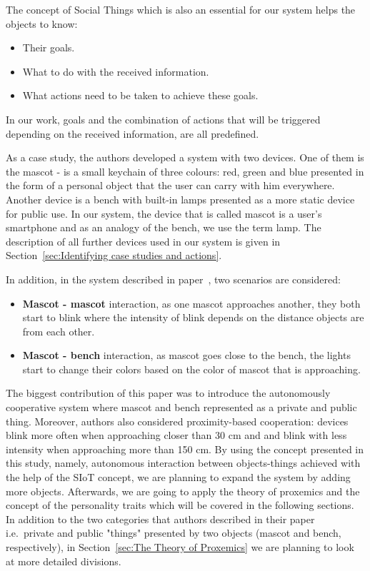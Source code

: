 The concept of Social Things which is also an essential for our system helps the objects to know:
\begin{itemize}
    \item Their goals.
    \item What to do with the received information.
    \item What actions need to be taken to achieve these goals.
\end{itemize}
In our work, goals and the combination of actions that will be triggered
depending on the received information, are all predefined.

As a case study, the authors developed a system with two devices.
One of them is the mascot - is a small keychain of three colours:
red, green and blue presented in the form of a personal object that the user can carry with him everywhere.
Another device is a bench with built-in lamps presented as a more static device for public use.
In our system, the device that is called mascot is a user's smartphone and as an
analogy of the bench, we use the term lamp.
The description of all further devices used in our system is given
in Section~\ref{sec:Identifying case studies and actions}.

In addition, in the system described in paper~\cite{okada2016autonomous}, two scenarios are considered:
\begin{itemize}
  \item \textbf{Mascot - mascot} interaction, as one mascot approaches another, they both start to blink where the
        intensity of blink depends on the distance objects are from each other.
  \item \textbf{Mascot - bench} interaction, as mascot goes close to the bench, the lights
        start to change their colors based on the color of mascot that is approaching.
\end{itemize}

The biggest contribution of this paper was to introduce the autonomously cooperative
system where mascot and bench represented as a private and public thing.
Moreover, authors also considered proximity-based cooperation: devices blink more often when
approaching closer than 30 cm and and blink with less intensity when approaching more than 150 cm.
By using the concept presented in this study, namely, autonomous interaction between objects-things
achieved with the help of the SIoT concept, we are planning to expand the system by adding more objects.
Afterwards, we are going to apply the theory of proxemics and the concept of the personality
traits which will be covered in the following sections.
In addition to the two categories that authors described in their paper i.e.\ private and public "things"
presented by two objects (mascot and bench, respectively), in Section~\ref{sec:The Theory of Proxemics}
we are planning to look at more detailed divisions.

